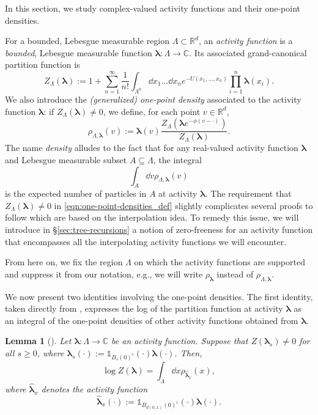 \documentclass[11pt]{article}
\newcommand{\R}{\mathbb R}
\newcommand{\C}{\mathbb C}
\newcommand{\bl}{\bm{\lambda}}
\newcommand{\indicator}[1]{\mathds{1}_{#1}}
\numberwithin{equation}{section}
\theoremstyle{plain}
\newtheorem{lemma}[theorem]{Lemma}
\theoremstyle{definition}
\theoremstyle{remark}
\begin{document}
In this section, we study complex-valued activity functions and their one-point densities.

For a bounded, Lebesgue measurable region $\Lambda\subset\R^{d}$, an \emph{activity function} is a \emph{bounded}, Lebesgue measurable function $\bl:\Lambda\rightarrow\C$.
Its associated grand-canonical partition function is
\begin{equation}
\label{eqn:one-point-densities_partition-function}
Z_{\Lambda}(\bl):=1+\sum_{n=1}^{\infty}\frac{1}{n!}\int_{\Lambda^{n}}\dd{x}_{1}\dots\dd{x}_{n}e^{-U(x_{1},\dots,x_{n})}\prod_{i=1}^{n}\bl(x_{i}).
\end{equation}
We also introduce the \emph{(generalized) one-point density} associated to the activity function $\bl$: if $Z_{\Lambda}(\bl)\ne 0$, we define, for each point $v\in\R^{d}$,
\begin{equation}
\label{eqn:one-point-densities_def}
\rho_{\Lambda,\bl}(v):=\bl(v)\frac{Z_{\Lambda}(\bl e^{-\phi(v-\cdot)})}{Z_{\Lambda}(\bl)}.
\end{equation}
The name \emph{density} alludes to the fact that for any real-valued activity function $\bl$ and Lebesgue measurable subset $A\subseteq\Lambda$, the integral
\begin{equation}
\int_{A}\dd{v}\rho_{\Lambda,\bl}(v)
\end{equation}
is the expected number of particles in $A$ at activity $\bl$.
The requirement that $Z_{\Lambda}(\bl)\ne 0$ in \eqref{eqn:one-point-densities_def} slightly complicates several proofs to follow which are based on the interpolation idea.
To remedy this issue, we will introduce in \S\ref{sec:tree-recursions} a notion of zero-freeness for an activity function that encompasses all the interpolating activity functions we will encounter.

From here on, we fix the region $\Lambda$ on which the activity functions are supported and suppress it from our notation, e.g., we will write $\rho_{\bl}$ instead of $\rho_{\Lambda,\bl}$.

We now present two identities involving the one-point densities.
The first identity, taken directly from \cite{michelen2023analyticity}, expresses the log of the partition function at activity $\bl$ as an integral of the one-point densities of other activity functions obtained from $\bl$.

\begin{lemma}[{\cite[Lemma 7]{michelen2023analyticity}}]
\label{lem:one-point-densities_log-Z}
Let $\bl:\Lambda\rightarrow\C$ be an activity function.
Suppose that $Z(\bl_{s})\ne 0$ for all $s\ge 0$, where $\bl_{s}(\cdot):=\indicator{B_{s}(0)^{c}}(\cdot)\bl(\cdot)$.
Then,
\begin{equation}
\label{eqn:one-point-densities_log-Z}
\log Z(\bl)=\int_{\Lambda}\dd{x}\rho_{\hat{\bl}_{x}}(x),
\end{equation}
where $\hat{\bl}_{x}$ denotes the activity function
\begin{equation}
\hat{\bl}_{x}(\cdot):=\indicator{B_{d(0,x)}(0)^{c}}(\cdot)\bl(\cdot).
\end{equation}
\end{lemma}
\end{document}
